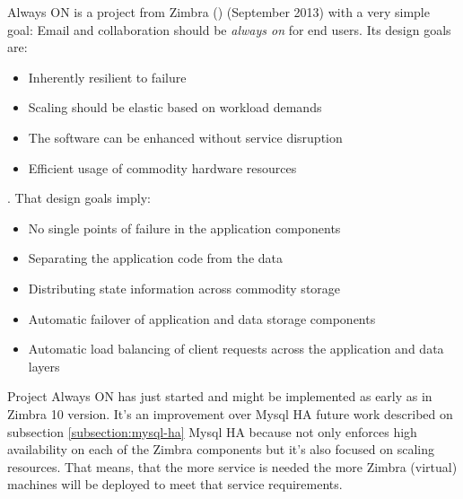 Always ON is a project from Zimbra (\cite{ZimbraProjectAlwaysOn}) (September 2013) with a very simple goal: Email and collaboration should be \textit{always on} for end users. Its design goals are:
\begin{itemize}
  \item Inherently resilient to failure
  \item Scaling should be elastic based on workload demands
  \item The software can be enhanced without service disruption
  \item Efficient usage of commodity hardware resources
\end{itemize}
. That design goals imply:
\begin{itemize}
  \item No single points of failure in the application components
  \item Separating the application code from the data
  \item Distributing state information across commodity storage
  \item Automatic failover of application and data storage components
  \item Automatic load balancing of client requests across the application and data layers
\end{itemize}

Project Always ON has just started and might be implemented as early as in Zimbra 10 version. It's an improvement over Mysql HA future work described on subsection {\ref{subsection:mysql-ha} Mysql HA} because not only enforces high availability on each of the Zimbra components but it's also focused on scaling resources. That means, that the more service is needed the more Zimbra (virtual) machines will be deployed to meet that service requirements.

